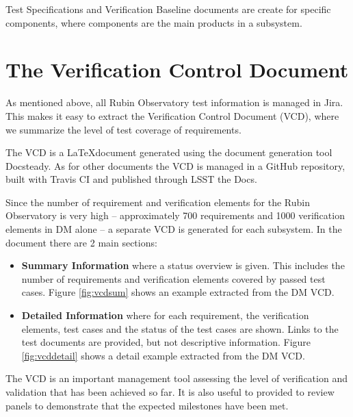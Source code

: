 Test Specifications and Verification Baseline documents are create for specific components, where components are the main products in a subsystem.


\section{The Verification Control Document}

As mentioned above, all Rubin Observatory test information is managed in Jira.
This makes it easy to extract the Verification Control Document (VCD), where we summarize the level of test coverage of requirements.

The VCD is a \LaTeX document generated using the document generation tool Docsteady.
As for other documents the VCD is managed in a GitHub repository, built with Travis CI and published through LSST the Docs.

Since the number of requirement and verification elements for the Rubin Observatory is very high --
approximately 700 requirements and 1000 verification elements in DM alone -- a separate VCD is generated for each subsystem.
In the document there are 2 main sections:

\begin{itemize}
\item \textbf{Summary Information} where a status overview is given.
This includes the number of requirements and verification elements covered by passed test cases.
Figure \ref{fig:vcdsum} shows an example extracted from the DM VCD.
\item \textbf{Detailed Information} where for each requirement, the verification elements, test cases
and the status of the test cases are shown. Links to the test documents are provided, but not descriptive information.
Figure \ref{fig:vcddetail} shows a detail example extracted from the DM VCD.
\end{itemize}

The VCD is an important management tool assessing the  level of verification and validation that has been achieved so far.
 It is also useful to provided to review panels to demonstrate that the expected milestones have been met.

